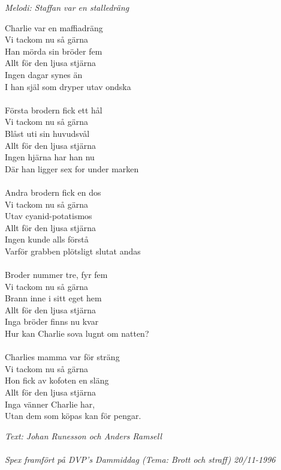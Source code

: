 {\footnotesize\textit{Melodi: Staffan var en stalledräng}}\par
\vspace{10pt}
Charlie var en maffiadräng\\
Vi tackom nu så gärna\\
Han mörda sin bröder fem\\
Allt för den ljusa stjärna\\
Ingen dagar synes än\\
I han själ som dryper utav ondska\\
\\
Första brodern fick ett hål\\
Vi tackom nu så gärna\\
Blåst uti sin huvudsvål\\
Allt för den ljusa stjärna\\
Ingen hjärna har han nu\\
Där han ligger sex for under marken\\
\\
Andra brodern fick en dos\\
Vi tackom nu så gärna\\
Utav cyanid-potatismos\\
Allt för den ljusa stjärna\\
Ingen kunde alls förstå\\
Varför grabben plötsligt slutat andas\\
\\
Broder nummer tre, fyr fem\\
Vi tackom nu så gärna\\
Brann inne i sitt eget hem\\
Allt för den ljusa stjärna\\
Inga bröder finns nu kvar\\
Hur kan Charlie sova lugnt om natten?\\
\\
Charlies mamma var för sträng\\
Vi tackom nu så gärna\\
Hon fick av kofoten en släng\\
Allt för den ljusa stjärna\\
Inga vänner Charlie har,\\
Utan dem som köpas kan för pengar.\par
\vspace{10pt}
{\footnotesize\textit{Text: Johan Runesson och Anders Ramsell}}\\
\\
{\footnotesize\textit{Spex framfört på DVP's Dammiddag (Tema: Brott och straff) 20/11-1996}}\\

